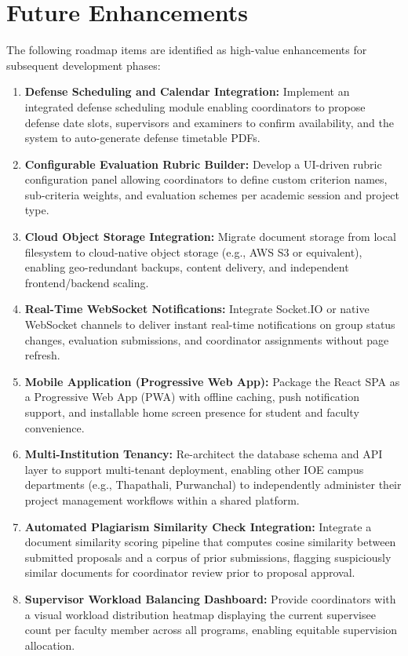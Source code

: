 \section{Future Enhancements}
The following roadmap items are identified as high-value enhancements for subsequent development phases:

\begin{enumerate}[label=\textbf{FE\arabic*.}]
    \item \textbf{Defense Scheduling and Calendar Integration:} Implement an integrated defense scheduling module enabling coordinators to propose defense date slots, supervisors and examiners to confirm availability, and the system to auto-generate defense timetable PDFs.
    
    \item \textbf{Configurable Evaluation Rubric Builder:} Develop a UI-driven rubric configuration panel allowing coordinators to define custom criterion names, sub-criteria weights, and evaluation schemes per academic session and project type.
    
    \item \textbf{Cloud Object Storage Integration:} Migrate document storage from local filesystem to cloud-native object storage (e.g., AWS S3 or equivalent), enabling geo-redundant backups, content delivery, and independent frontend/backend scaling.
    
    \item \textbf{Real-Time WebSocket Notifications:} Integrate Socket.IO or native WebSocket channels to deliver instant real-time notifications on group status changes, evaluation submissions, and coordinator assignments without page refresh.
    
    \item \textbf{Mobile Application (Progressive Web App):} Package the React SPA as a Progressive Web App (PWA) with offline caching, push notification support, and installable home screen presence for student and faculty convenience.
    
    \item \textbf{Multi-Institution Tenancy:} Re-architect the database schema and API layer to support multi-tenant deployment, enabling other IOE campus departments (e.g., Thapathali, Purwanchal) to independently administer their project management workflows within a shared platform.
    
    \item \textbf{Automated Plagiarism Similarity Check Integration:} Integrate a document similarity scoring pipeline that computes cosine similarity between submitted proposals and a corpus of prior submissions, flagging suspiciously similar documents for coordinator review prior to proposal approval.
    
    \item \textbf{Supervisor Workload Balancing Dashboard:} Provide coordinators with a visual workload distribution heatmap displaying the current supervisee count per faculty member across all programs, enabling equitable supervision allocation.
\end{enumerate}

